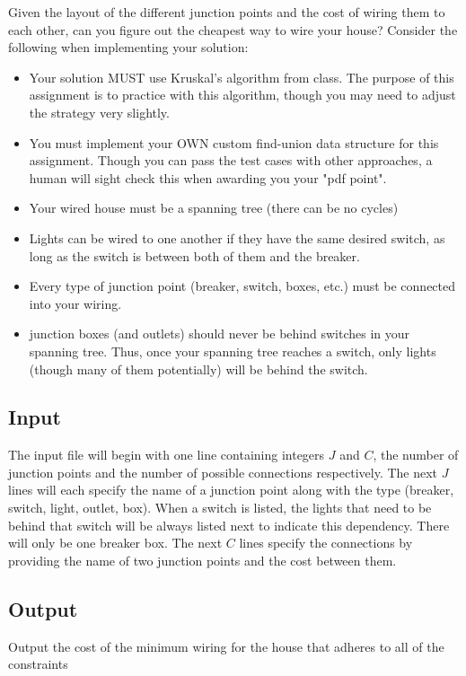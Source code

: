 \documentclass[11pt]{article}
\begin{document}
Given the layout of the different junction points and the cost of wiring them to each other, can you figure out the cheapest way to wire your house? Consider the following when implementing your solution:

\begin{itemize}
	\item Your solution MUST use Kruskal's algorithm from class. The purpose of this assignment is to practice with this algorithm, though you may need to adjust the strategy very slightly.
	\item You must implement your OWN custom find-union data structure for this assignment. Though you can pass the test cases with other approaches, a human will sight check this when awarding you your "pdf point".
	\item Your wired house must be a spanning tree (there can be no cycles)
	\item Lights can be wired to one another if they have the same desired switch, as long as the switch is between both of them and the breaker.
	\item Every type of junction point (breaker, switch, boxes, etc.) must be connected into your wiring. 
	\item junction boxes (and outlets) should never be behind switches in your spanning tree. Thus, once your spanning tree reaches a switch, only lights (though many of them potentially) will be behind the switch.
\end{itemize}

\subsection*{Input}
The input file will begin with one line containing integers $J$ and $C$, the number of junction points and the number of possible connections respectively. The next $J$ lines will each specify the name of a junction point along with the type (breaker, switch, light, outlet, box). When a switch is listed, the lights that need to be behind that switch will be always listed next to indicate this dependency. There will only be one breaker box. The next $C$ lines specify the connections by providing the name of two junction points and the cost between them.

\subsection*{Output}

Output the cost of the minimum wiring for the house that adheres to all of the constraints
\end{document}
